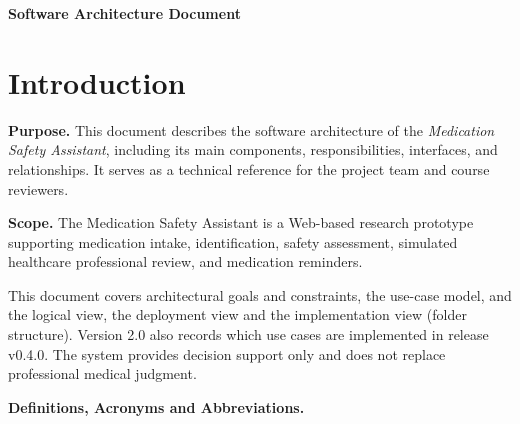\documentclass[10pt,letterpaper]{article}
\newcommand{\DocumentTitle}{Software Architecture Document}
\newcommand{\upd}[1]{{\color{pafourblue}#1}}
\newcommand{\frontmattertitle}[1]{%
  \begin{center}{\normalfont\bfseries\fontsize{16}{20}\selectfont #1\par}\end{center}%
}
\begin{document}
{}
\listoffigures
\clearpage

{}
\listoftables
\clearpage

\frontmattertitle{\DocumentTitle}


\section{Introduction}
\label{sec:introduction}

\noindent\textbf{Purpose.}
This document describes the software architecture of the
\emph{Medication Safety Assistant}, including its main components,
responsibilities, interfaces, and relationships. It serves as
a technical reference for the project team and course reviewers.

\medskip
\noindent\textbf{Scope.}
The Medication Safety Assistant is a Web-based research prototype
supporting medication intake, identification, safety assessment,
simulated healthcare professional review, and medication reminders.

This document covers architectural goals and constraints,
the use-case model, and the logical view\upd{, the deployment view and
the implementation view (folder structure). Version 2.0 also records
which use cases are implemented in release v0.4.0}. The system provides
decision support only and does not replace professional medical
judgment.



\medskip
\noindent\textbf{Definitions, Acronyms and Abbreviations.}
\end{document}
